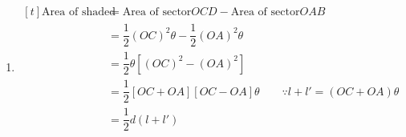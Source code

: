 \documentclass{report}
\begin{document}
\begin{question}
\begin{enumerate}[label=(\alph*)]
		\item $\begin{aligned}[t]
		      \text{Area of shaded region} &= \text{Area of sector} OCD - \text{Area of sector} OAB\\
		      & = \dfrac{1}{2}(OC)^2\theta - \dfrac{1}{2}(OA)^2\theta\\
		      &= \dfrac{1}{2}\theta\left[(OC)^2 - (OA)^2\right]\\
		      &= \dfrac{1}{2}\left[OC + OA\right]\left[OC - OA\right]\theta \qquad \because l + l' = (OC + OA)\theta\\
		      & = \dfrac{1}{2}d(l + l')
		\end{aligned}$
	\end{enumerate}
\end{question}

\end{document}
